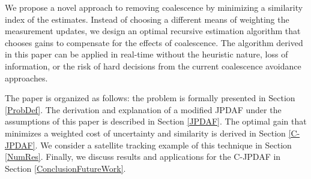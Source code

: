 \documentclass[letterpaper, 10pt, conference]{ieeeconf}
\begin{document}
We propose a novel approach to removing coalescence by minimizing a similarity index of the estimates.
Instead of choosing a different means of weighting the measurement updates, we design an optimal recursive estimation algorithm that chooses gains to compensate for the effects of coalescence.
The algorithm derived in this paper can be applied in real-time without the heuristic nature, loss of information, or the risk of hard decisions from the current coalescence avoidance approaches.

The paper is organized as follows: the problem is formally presented in Section \ref{ProbDef}.
The derivation and explanation of a modified JPDAF under the assumptions of this paper is described in Section \ref{JPDAF}.
The optimal gain that minimizes a weighted cost of uncertainty and similarity is derived in Section \ref{C-JPDAF}.
We consider a satellite tracking example of this technique in Section \ref{NumRes}.
Finally, we discuss results and applications for the C-JPDAF in Section \ref{ConclusionFutureWork}.

\end{document}
